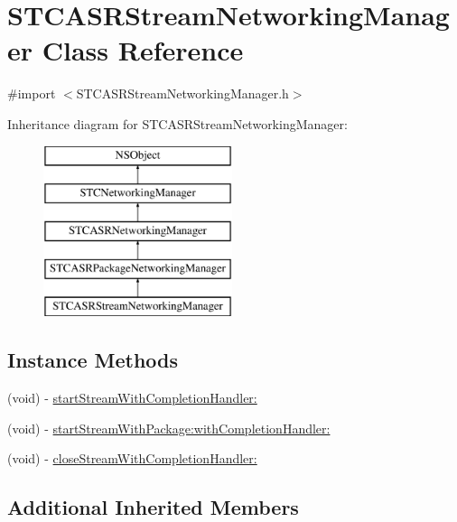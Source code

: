 \hypertarget{interface_s_t_c_a_s_r_stream_networking_manager}{}\section{S\+T\+C\+A\+S\+R\+Stream\+Networking\+Manager Class Reference}
\label{interface_s_t_c_a_s_r_stream_networking_manager}


{\ttfamily \#import $<$S\+T\+C\+A\+S\+R\+Stream\+Networking\+Manager.\+h$>$}

Inheritance diagram for S\+T\+C\+A\+S\+R\+Stream\+Networking\+Manager\+:\begin{figure}[H]
\begin{center}
\leavevmode
\includegraphics[height=5.000000cm]{interface_s_t_c_a_s_r_stream_networking_manager}
\end{center}
\end{figure}
\subsection*{Instance Methods}
\begin{DoxyCompactItemize}
\item 
(void) -\/ \hyperlink{interface_s_t_c_a_s_r_stream_networking_manager_a49f5bd94217465b2013e4e2b44e46f68}{start\+Stream\+With\+Completion\+Handler\+:}
\item 
(void) -\/ \hyperlink{interface_s_t_c_a_s_r_stream_networking_manager_a221943cbf9a49b90a6e35fdb06bf4216}{start\+Stream\+With\+Package\+:with\+Completion\+Handler\+:}
\item 
(void) -\/ \hyperlink{interface_s_t_c_a_s_r_stream_networking_manager_ac401b83981c6ca10432d6af274002a47}{close\+Stream\+With\+Completion\+Handler\+:}
\end{DoxyCompactItemize}
\subsection*{Additional Inherited Members}


